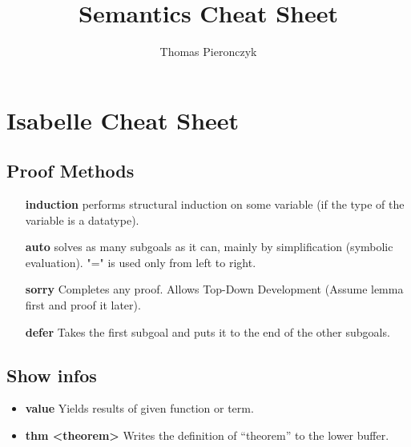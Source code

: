 \documentclass{article}
\title{Semantics Cheat Sheet}
\author{Thomas Pieronczyk}
\begin{document}
\maketitle
\section{Isabelle Cheat Sheet}
\subsection{Proof Methods}
\begin{itemize}
	\item [\textbf{induction}] performs structural induction on some variable (if the type of the variable is a datatype).
	\item [\textbf{auto}] solves as many subgoals as it can, mainly by simplification (symbolic evaluation). "=" is used only from left to right.
	\item [\textbf{sorry}] Completes any proof. Allows Top-Down Development (Assume lemma first and proof it later).
	\item [\textbf{defer}] Takes the first subgoal and puts it to the end of the other subgoals.
\end{itemize}
\subsection{Show infos}
\begin{itemize}
	\item \textbf{value} Yields results of given function or term.
	\item \textbf{thm \textless theorem\textgreater} Writes the definition of "`theorem"' to the lower buffer.
\end{itemize}
\end{document}
